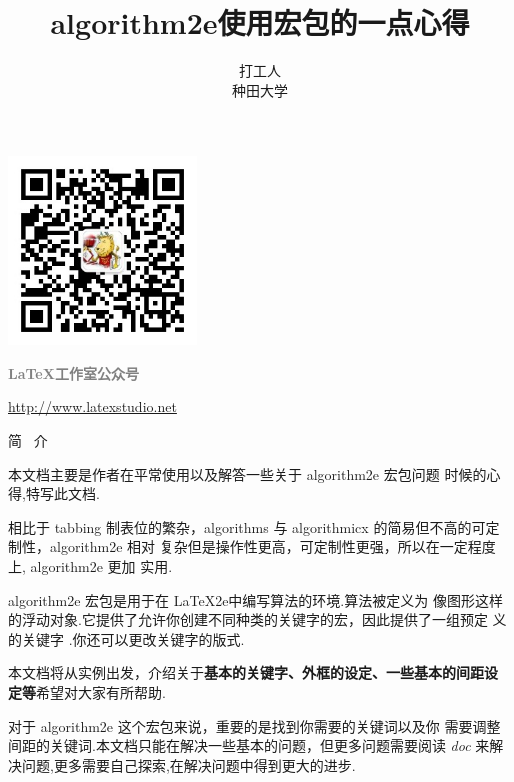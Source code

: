 \documentclass[UTF8]{ctexart}
\title{algorithm2e使用宏包的一点心得}
\author{\zihao{4} \fangsong 打工人\\  \songti 种田大学}
\newcommand{\textbl}[1]{\textbf{\textcolor{maincolor}{#1}}}      %
\begin{document}
	
\maketitle

\vspace{1em}
\centerline{\includegraphics[width=5cm]{gongzhonghao.jpg}}
\centerline{\textcolor{gray}{\bfseries \LaTeX 工作室公众号}} 
\centerline{\textcolor{gray}{\url{http://www.latexstudio.net}}} 
	

\begin{center}
	 \fontsize{25}{30} \kaishu	简 \  介  \selectfont
\end{center}

		\par 本文档主要是作者在平常使用以及解答一些关于 \textcolor{pack}{algorithm2e} 宏包问题
		时候的心得,特写此文档.
		\par 相比于 \textcolor{pack}{tabbing} 制表位的繁杂，\textcolor{pack}{algorithms} 与 
		\textcolor{pack}{algorithmicx} 的简易但不高的可定制性，\textcolor{pack}{algorithm2e} 相对
		复杂但是操作性更高，可定制性更强，所以在一定程度上, \textcolor{pack}{algorithm2e} 更加
	    实用.	    
	    \par\textcolor{pack}{algorithm2e} 宏包是用于在 \LaTeX 2e中编写算法的环境.算法被定义为
	    像图形这样的浮动对象.它提供了允许你创建不同种类的关键字的宏，因此提供了一组预定
	    义的关键字 .你还可以更改关键字的版式.
	    \par 本文档将从实例出发，介绍关于\textbl{基本的关键字、外框的设定、一些基本的间距设
	    	定等}希望对大家有所帮助.
	    \par 对于 \textcolor{pack}{algorithm2e} 这个宏包来说，重要的是找到你需要的关键词以及你
	    需要调整间距的关键词.本文档只能在解决一些基本的问题，但更多问题需要阅读 \textit{doc} 来解决问题,更多需要自己探索,在解决问题中得到更大的进步.
		


\end{document}
